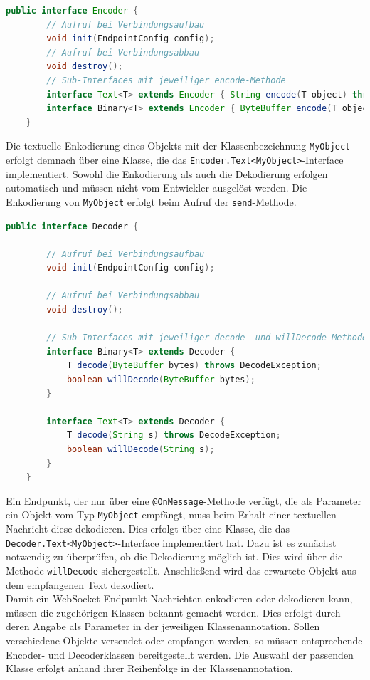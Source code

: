 \documentclass[11pt,a4paper,titlepage]{scrartcl}
\numberwithin{equation}{section}
\begin{document}
\begin{lstlisting}[frame=single, language=Java, caption=Java: Encoder-Interface]
	public interface Encoder {
		// Aufruf bei Verbindungsaufbau
		void init(EndpointConfig config);
		// Aufruf bei Verbindungsabbau
		void destroy();
		// Sub-Interfaces mit jeweiliger encode-Methode
		interface Text<T> extends Encoder { String encode(T object) throws EncodeException; }
		interface Binary<T> extends Encoder { ByteBuffer encode(T object) throws EncodeException; }
	}
\end{lstlisting}

\noindent Die textuelle Enkodierung eines Objekts mit der Klassenbezeichnung \texttt{MyObject} erfolgt demnach über eine Klasse, die das \texttt{Encoder.Text<MyObject>}-Interface implementiert. Sowohl die Enkodierung als auch die Dekodierung erfolgen automatisch und müssen nicht vom Entwickler ausgelöst werden. Die Enkodierung von \texttt{MyObject} erfolgt beim Aufruf der \texttt{send}-Methode. \medskip

\begin{lstlisting}[frame=single, language=Java, caption=Java: Decoder-Interface]
	public interface Decoder {
	
		// Aufruf bei Verbindungsaufbau
		void init(EndpointConfig config);
		
		// Aufruf bei Verbindungsabbau
		void destroy();
		
		// Sub-Interfaces mit jeweiliger decode- und willDecode-Methode
		interface Binary<T> extends Decoder {
			T decode(ByteBuffer bytes) throws DecodeException;
			boolean willDecode(ByteBuffer bytes);
		}
		
		interface Text<T> extends Decoder {
			T decode(String s) throws DecodeException;
			boolean willDecode(String s);
		}
	}
\end{lstlisting}

\noindent Ein Endpunkt, der nur über eine \texttt{@OnMessage}-Methode verfügt, die als Parameter ein Objekt vom Typ \texttt{MyObject} empfängt, muss beim Erhalt einer textuellen Nachricht diese dekodieren. Dies erfolgt über eine Klasse, die das \texttt{Decoder.Text<MyObject>}-Interface implementiert hat. Dazu ist es zunächst notwendig zu überprüfen, ob die Dekodierung möglich ist. Dies wird über die Methode \texttt{willDecode} sichergestellt. Anschließend wird das erwartete Objekt aus dem empfangenen Text dekodiert.\\

\noindent Damit ein WebSocket-Endpunkt Nachrichten enkodieren oder dekodieren kann, müssen die zugehörigen Klassen bekannt gemacht werden. Dies erfolgt durch deren Angabe als Parameter in der jeweiligen Klassenannotation. Sollen verschiedene Objekte versendet oder empfangen werden, so müssen entsprechende Encoder- und Decoderklassen bereitgestellt werden. Die Auswahl der passenden Klasse erfolgt anhand ihrer Reihenfolge in der Klassenannotation.\medskip
\end{document}

